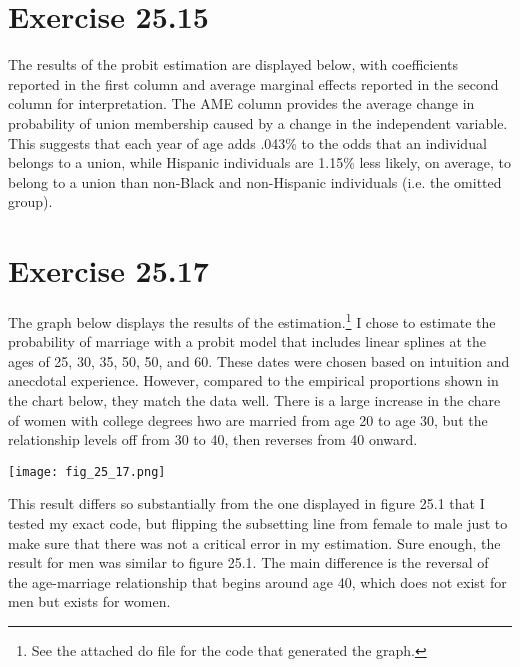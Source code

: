 \documentclass{article}
\begin{document}
\pagebreak
\section*{Exercise 25.15}
The results of the probit estimation are displayed below, with coefficients reported in the first column and average marginal effects reported in the second column for interpretation. The AME column provides the average change in probability of union membership caused by a change in the independent variable. This suggests that each year of age adds .043\% to the odds that an individual belongs to a union, while Hispanic individuals are 1.15\% less likely, on average, to belong to a union than non-Black and non-Hispanic individuals (i.e. the omitted group).

\begin{center}
	
\end{center}

\pagebreak
\section*{Exercise 25.17}
The graph below displays the results of the estimation.\footnote{See the attached do file for the code that generated the graph.} I chose to estimate the probability of marriage with a probit model that includes linear splines at the ages of 25, 30, 35, 50, 50, and 60. These dates were chosen based on intuition and anecdotal experience. However, compared to the empirical proportions shown in the chart below, they match the data well. There is a large increase in the chare of women with college degrees hwo are married from age 20 to age 30, but the relationship levels off from 30 to 40, then reverses from 40 onward.
\begin{center}
	\texttt{[image: fig\_25\_17.png]}
\end{center}
This result differs so substantially from the one displayed in figure 25.1 that I tested my exact code, but flipping the subsetting line from female to male just to make sure that there was not a critical error in my estimation. Sure enough, the result for men was similar to figure 25.1. The main difference is the reversal of the age-marriage relationship that begins around age 40, which does not exist for men but exists for women.

\pagebreak
\end{document}
